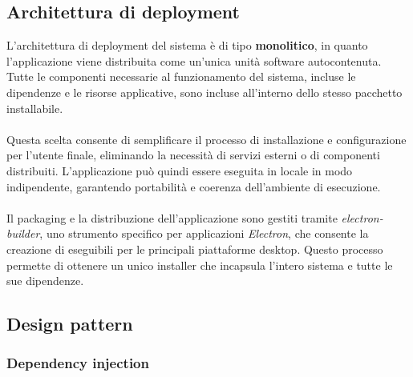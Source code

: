 \documentclass[a4paper,12pt]{article}
\begin{document}
{        \subsection{Architettura di deployment} {
            L’architettura di deployment del sistema è di tipo \textbf{monolitico}, in quanto l’applicazione viene distribuita come un’unica unità software autocontenuta. Tutte le componenti necessarie al funzionamento del sistema, incluse le dipendenze e le risorse applicative, sono incluse all’interno dello stesso pacchetto installabile.\\
            \\
            Questa scelta consente di semplificare il processo di installazione e configurazione per l’utente finale, eliminando la necessità di servizi esterni o di componenti distribuiti. L’applicazione può quindi essere eseguita in locale in modo indipendente, garantendo portabilità e coerenza dell’ambiente di esecuzione.\\
            \\
            Il packaging e la distribuzione dell’applicazione sono gestiti tramite \textit{electron-builder}, uno strumento specifico per applicazioni \textit{Electron}, che consente la creazione di eseguibili per le principali piattaforme desktop. Questo processo permette di ottenere un unico installer che incapsula l’intero sistema e tutte le sue dipendenze.
        }

        \subsection{Design pattern} {
            \subsubsection{Dependency injection} {
                
            }
        }
    }
\end{document}
